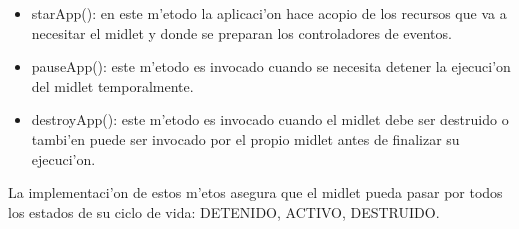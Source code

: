 \begin{itemize}
\item starApp(): en este m'etodo la aplicaci'on hace acopio de los recursos que va a necesitar el midlet y donde se preparan los controladores de eventos.
\item pauseApp(): este m'etodo es invocado cuando se necesita detener la ejecuci'on del midlet temporalmente.
\item destroyApp(): este m'etodo es invocado cuando el midlet debe ser destruido o tambi'en puede ser invocado por el propio midlet antes de finalizar su ejecuci'on.
\end{itemize}

La implementaci'on de estos m'etos asegura que el midlet pueda pasar por todos los estados de su ciclo de vida: DETENIDO, ACTIVO, DESTRUIDO.